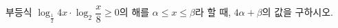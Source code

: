 부등식 $\log_{\frac{1}{2}} 4x\cdot\log_2 \dfrac{x}{8}\ge 0$의 해를 $\alpha\le x\le\beta$라 할 때, $4\alpha+\beta$의 값을 구하시오.
